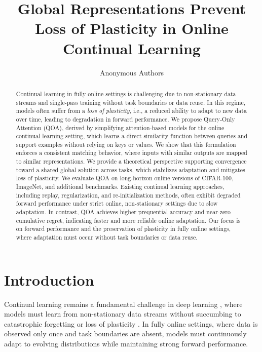 \documentclass{article}
\title{Global Representations Prevent Loss of Plasticity in Online Continual Learning}
\author{Anonymous Authors
}
\begin{document}
\nolinenumbers


\maketitle

\begin{abstract}

Continual learning in fully online settings is challenging due to non-stationary data streams and single-pass training without task boundaries or data reuse. In this regime, models often suffer from a \emph{loss of plasticity}, i.e., a reduced ability to adapt to new data over time, leading to degradation in forward performance. We propose Query-Only Attention (QOA), derived by simplifying attention-based models for the online continual learning setting, which learns a direct similarity function between queries and support examples without relying on keys or values. We show that this formulation enforces a consistent matching behavior, where inputs with similar outputs are mapped to similar representations. We provide a theoretical perspective supporting convergence toward a shared global solution across tasks, which stabilizes adaptation and mitigates loss of plasticity. We evaluate QOA on long-horizon online versions of CIFAR-100, ImageNet, and additional benchmarks. Existing continual learning approaches, including replay, regularization, and re-initialization methods, often exhibit degraded forward performance under strict online, non-stationary settings due to slow adaptation. In contrast, QOA achieves higher prequential accuracy and near-zero cumulative regret, indicating faster and more reliable online adaptation. Our focus is on forward performance and the preservation of plasticity in fully online settings, where adaptation must occur without task boundaries or data reuse.

\end{abstract}



\section{Introduction}
Continual learning remains a fundamental challenge in deep learning \citep{wang2024comprehensive}, where models must learn from non-stationary data streams without succumbing to catastrophic forgetting \citep{kirkpatrick2017overcoming} or loss of plasticity \citep{dohare2024loss}. In fully online settings, where data is observed only once and task boundaries are absent, models must continuously adapt to evolving distributions while maintaining strong forward performance.
\end{document}
